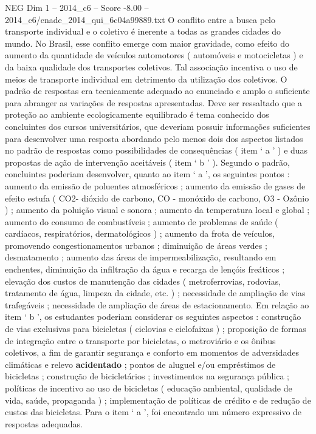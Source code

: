 \begin{textsample}{NEG Dim 1 – 2014\_c6 – Score -8.00 – 2014\_c6/enade\_2014\_qui\_6c04a99889.txt}
O conflito entre a busca pelo transporte individual e o coletivo é inerente a todas as grandes cidades do mundo.
No Brasil, esse conflito emerge com maior gravidade, como efeito do aumento da quantidade de veículos automotores ( automóveis e motocicletas ) e da baixa qualidade dos transportes coletivos.
Tal associação incentiva o uso de meios de transporte individual em detrimento da utilização dos coletivos.
O padrão de respostas era tecnicamente adequado ao enunciado e amplo o suficiente para abranger as variações de respostas apresentadas.
Deve ser ressaltado que a proteção ao ambiente ecologicamente equilibrado é tema conhecido dos concluintes dos cursos universitários, que deveriam possuir informações suficientes para desenvolver uma resposta abordando pelo menos dois dos aspectos listados no padrão de respostas como possibilidades de consequências ( item ‘ a ’ ) e duas propostas de ação de intervenção aceitáveis ( item ‘ b ’ ).
Segundo o padrão, concluintes poderiam desenvolver, quanto ao item ‘ a ’, os seguintes pontos : aumento da emissão de poluentes atmosféricos ; aumento da emissão de gases de efeito estufa ( CO2- dióxido de carbono, CO - monóxido de carbono, O3 - Ozônio ) ; aumento da poluição visual e sonora ; aumento da temperatura local e global ; aumento do consumo de combustíveis ; aumento de problemas de saúde ( cardíacos, respiratórios, dermatológicos ) ; aumento da frota de veículos, promovendo congestionamentos urbanos ; diminuição de áreas verdes ; desmatamento ; aumento das áreas de impermeabilização, resultando em enchentes, diminuição da infiltração da água e recarga de lençóis freáticos ; elevação dos custos de manutenção das cidades ( metroferrovias, rodovias, tratamento de água, limpeza da cidade, etc. ) ; necessidade de ampliação de vias trafegáveis ; necessidade de ampliação de áreas de estacionamento.
Em relação ao item ‘ b ’, os estudantes poderiam considerar os seguintes aspectos : construção de vias exclusivas para bicicletas ( ciclovias e ciclofaixas ) ; proposição de formas de integração entre o transporte por bicicletas, o metroviário e os ônibus coletivos, a fim de garantir segurança e conforto em momentos de adversidades climáticas e relevo \textbf{acidentado} ; pontos de aluguel e/ou empréstimos de bicicletas ; construção de bicicletários ; investimentos na segurança pública ; políticas de incentivo ao uso de bicicletas ( educação ambiental, qualidade de vida, saúde, propaganda ) ; implementação de políticas de crédito e de redução de custos das bicicletas.
Para o item ‘ a ’, foi encontrado um número expressivo de respostas adequadas.

\end{textsample}
